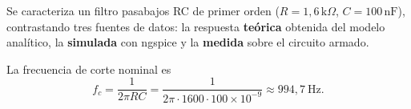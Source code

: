 Se caracteriza un filtro pasabajos RC de primer orden ($R = 1{,}6\,\mathrm{k}\Omega$, $C = 100\,\mathrm{nF}$), contrastando tres fuentes de datos: la respuesta \textbf{teórica} obtenida del modelo analítico, la \textbf{simulada} con ngspice y la \textbf{medida} sobre el circuito armado.

La frecuencia de corte nominal es
\[ f_c = \frac{1}{2\pi RC} = \frac{1}{2\pi \cdot 1600 \cdot 100\times10^{-9}} \approx 994{,}7\ \mathrm{Hz}. \]
